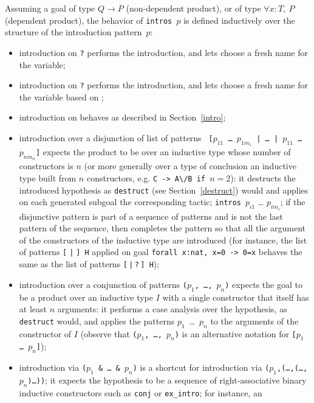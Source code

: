 \begin{coq_example*}
Assuming a goal of type $Q \to P$ (non-dependent product), or
of type $\forall x:T,~P$ (dependent product), the behavior of
{\tt intros $p$} is defined inductively over the structure of the
introduction pattern~$p$:
\begin{itemize}
\item introduction on \texttt{?} performs the introduction, and lets {\Coq}
  choose a fresh name for the variable;
\item introduction on \texttt{?\ident} performs the introduction, and
  lets {\Coq} choose a fresh name for the variable based on {\ident};
\item introduction on \texttt{\ident} behaves as described in
  Section~\ref{intro};
\item introduction over a disjunction of list of patterns {\tt
  [$p_{11}$ \dots\ $p_{1m_1}$ | \dots\ | $p_{11}$ \dots\ $p_{nm_n}$]}
  expects the product to be over an inductive type
  whose number of constructors is $n$ (or more generally over a type
  of conclusion an inductive type built from $n$ constructors,
  e.g. {\tt C -> A\textbackslash/B if $n=2$}): it destructs the introduced
  hypothesis as {\tt destruct} (see Section~\ref{destruct}) would and
  applies on each generated subgoal the corresponding tactic;
  \texttt{intros}~$p_{i1}$ {\ldots} $p_{im_i}$; if the disjunctive
  pattern is part of a sequence of patterns and is not the last
  pattern of the sequence, then {\Coq} completes the pattern so that all
  the argument of the constructors of the inductive type are
  introduced (for instance, the list of patterns {\tt [$\;$|$\;$] H}
  applied on goal {\tt forall x:nat, x=0 -> 0=x} behaves the same as
  the list of patterns {\tt [$\,$|$\,$?$\,$] H});
\item introduction over a conjunction of patterns {\tt ($p_1$, \ldots,
  $p_n$)} expects the goal to be a product over an inductive type $I$ with a
  single constructor that itself has at least $n$ arguments: it
  performs a case analysis over the hypothesis, as {\tt destruct}
  would, and applies the patterns $p_1$~\ldots~$p_n$ to the arguments
  of the constructor of $I$ (observe that {\tt ($p_1$, {\ldots},
  $p_n$)} is an alternative notation for {\tt [$p_1$ {\ldots}
  $p_n$]});
\item introduction via {\tt ($p_1$ \& \dots\ \& $p_n$)}
  is a shortcut for introduction via
  {\tt ($p_1$,(\ldots,(\dots,$p_n$)\ldots))}; it expects the
  hypothesis to be a sequence of right-associative binary inductive
  constructors such as {\tt conj} or {\tt ex\_intro}; for instance, an

\end{itemize}
\end{coq_example*}
